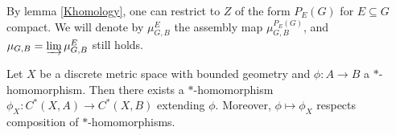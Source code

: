 \begin{rk}\label{projection}
By lemma \ref{Khomology}, one can restrict to $Z$ of the form $P_E(G)$ for $E\subseteq G$ compact. We will denote by $\mu_{G,B}^E$ the assembly map $\mu_{G,B}^{P_E(G)}$, and $\mu_{G,B} = \varinjlim \mu_{G,B}^{E}$ still holds.
\end{rk}

\begin{thm}\label{Xfunctor}
Let $X$ be a discrete metric space with bounded geometry and $\phi : A\rightarrow B$ a $*$-homomorphism. Then there exists a $*$-homomorphism $\phi_X : C^*(X,A)\rightarrow C^*(X,B)$ extending $\phi$. Moreover, $\phi\mapsto \phi_X$ respects composition of $*$-homomorphisms.
\end{thm}


